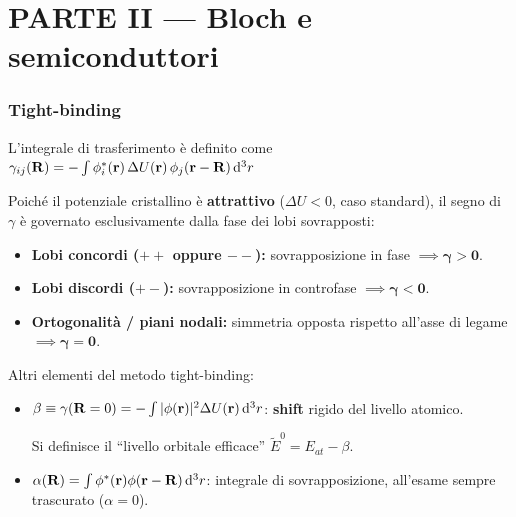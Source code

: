 \part*{\centering PARTE II --- Bloch e semiconduttori}
\vspace{-0.3cm}

\section{Tight-binding}

L'integrale di trasferimento è definito come $\gamma_{ij}(\mathbf{R}) = -\int \phi_i^*(\mathbf{r})\,\Delta U(\mathbf{r})\,\phi_j(\mathbf{r}-\mathbf{R})\,\mathrm{d}^3 r$

Poiché il potenziale cristallino è \textbf{attrattivo} ($\Delta U < 0$, caso standard), il segno di $\gamma$ è governato esclusivamente dalla fase dei lobi sovrapposti:
\begin{itemize}
    \setlength{\itemsep}{1pt}
    \item \textbf{Lobi concordi ($++$ oppure $--$):} sovrapposizione in fase $\implies \bm{\gamma > 0}$.
    \item \textbf{Lobi discordi ($+-$):} sovrapposizione in controfase $\implies \bm{\gamma < 0}$.
    \item \textbf{Ortogonalità / piani nodali:} simmetria opposta rispetto all'asse di legame $\implies \bm{\gamma = 0}$.
\end{itemize}


\vspace{0.15cm}
\noindent Altri elementi del metodo tight-binding:
\begin{itemize}
  \item $\beta \equiv \gamma(\mathbf{R}=0) = -\int|\phi(\mathbf{r})|^2\Delta U(\mathbf{r})\,\mathrm{d}^3r$: \textbf{shift} rigido del livello atomico. 
  
  Si definisce il ``livello orbitale efficace'' $\tilde E^0 = E_{at} - \beta$.
  \item $\alpha(\mathbf{R})=\int\phi^*(\mathbf{r})\phi(\mathbf{r}-\mathbf{R})\,\mathrm{d}^3r$: integrale di sovrapposizione, all'esame sempre trascurato ($\alpha=0$).
\end{itemize}

